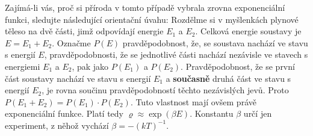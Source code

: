 \begin{mdframed}[style=mdexam]
\begin{example}
    Zajímá-li vás, proč si příroda v tomto případě vybrala zrovna exponenciální funkci, sledujte
    následující orientační úvahu: Rozdělme si v myšlenkách plynové těleso na dvě části, jimž
    odpovídají energie \(E_1\) a \(E_2\). Celková energie soustavy je \(E = E_1 + E_2\). Označme
    \(P(E)\) pravděpodobnost, že, se soustava nachází ve stavu s energií \(E\), pravděpodobnosti, že
    se jednotlivé části nachází nezávisle ve stavech s energiemi \(E_1\) a \(E_2\), pak jako
    \(P(E_1)\) a \(P(E_2)\). Pravděpodobnost, že se první část soustavy nachází ve stavu s energií
    \(E_1\) a \textbf{současně} druhá část ve stavu s energií \(E_2\), je rovna součinu
    pravděpodobností těchto nezávislých jevů. Proto \(P(E_1 + E_2) = P(E_1) \cdot P(E_2)\). Tuto
    vlastnost mají ovšem právě exponenciální funkce. Platí tedy \(\varrho \approx\exp(\beta E)\).
    Konstantu \(\beta\) určí jen experiment, z něhož vychází \(\beta = - (kT)^{-1}\).
    

\end{example}
\end{mdframed}
